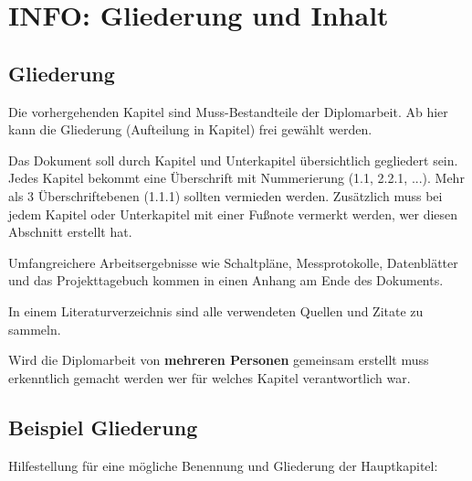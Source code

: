 


\chapter{INFO: Gliederung und Inhalt}

\section{Gliederung}

Die vorhergehenden Kapitel sind Muss-Bestandteile der Diplomarbeit.
Ab hier kann die Gliederung (Aufteilung in Kapitel) frei gewählt werden.

Das Dokument soll durch Kapitel und Unterkapitel übersichtlich gegliedert sein. 
Jedes Kapitel bekommt eine Überschrift mit Nummerierung (1.1, 2.2.1, ...). Mehr als 3 Überschriftebenen (1.1.1) sollten vermieden werden. Zusätzlich muss bei jedem Kapitel oder Unterkapitel mit einer Fußnote vermerkt werden, wer diesen Abschnitt erstellt hat.

Umfangreichere Arbeitsergebnisse wie Schaltpläne, Messprotokolle, Datenblätter und das Projekttagebuch kommen in einen Anhang am Ende des Dokuments.

In einem Literaturverzeichnis sind alle verwendeten Quellen und Zitate zu sammeln.

Wird die Diplomarbeit von \textbf{mehreren Personen} gemeinsam erstellt muss erkenntlich gemacht werden wer für welches Kapitel verantwortlich war.

\section{Beispiel Gliederung}

Hilfestellung für eine mögliche Benennung und Gliederung der Hauptkapitel:

